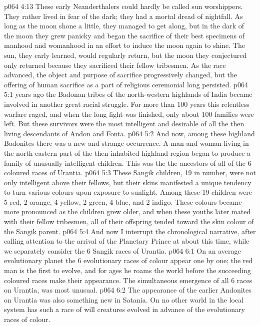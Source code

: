 \vs p064 4:13 These early Neanderthalers could hardly be called sun worshippers. They rather lived in fear of the dark; they had a mortal dread of nightfall. As long as the moon shone a little, they managed to get along, but in the dark of the moon they grew panicky and began the sacrifice of their best specimens of manhood and womanhood in an effort to induce the moon again to shine. The sun, they early learned, would regularly return, but the moon they conjectured only returned because they sacrificed their fellow tribesmen. As the race advanced, the object and purpose of sacrifice progressively changed, but the offering of human sacrifice as a part of religious ceremonial long persisted.
\vs p064 5:1  years ago the Badonan tribes of the north\hyp{}western highlands of India became involved in another great racial struggle. For more than 100 years this relentless warfare raged, and when the long fight was finished, only about 100 families were left. But these survivors were the most intelligent and desirable of all the then living descendants of Andon and Fonta.
\vs p064 5:2 And now, among these highland Badonites there was a new and strange occurrence. A man and woman living in the north\hyp{}eastern part of the then inhabited highland region began  to produce a family of unusually intelligent children. This was the  the ancestors of all of the 6 coloured races of Urantia.
\vs p064 5:3 These Sangik children, 19 in number, were not only intelligent above their fellows, but their skins manifested a unique tendency to turn various colours upon exposure to sunlight. Among these 19 children were 5 red, 2 orange, 4 yellow, 2 green, 4 blue, and 2 indigo. These colours became more pronounced as the children grew older, and when these youths later mated with their fellow tribesmen, all of their offspring tended toward the skin colour of the Sangik parent.
\vs p064 5:4 And now I interrupt the chronological narrative, after calling attention to the arrival of the Planetary Prince at about this time, while we separately consider the 6 Sangik races of Urantia.
\vs p064 6:1 On an average evolutionary planet the 6 evolutionary races of colour appear one by one; the red man is the first to evolve, and for ages he roams the world before the succeeding coloured races make their appearance. The simultaneous emergence of all 6 races on Urantia,  was most unusual.
\vs p064 6:2 The appearance of the earlier Andonites on Urantia was also something new in Satania. On no other world in the local system has such a race of will creatures evolved in advance of the evolutionary races of colour.
